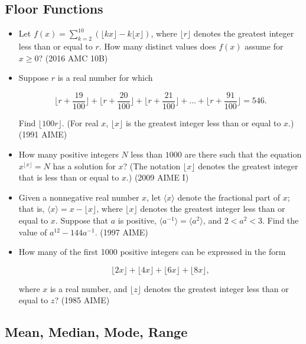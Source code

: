 \documentclass{article}
\begin{document}
\subsection{Floor Functions}

\begin{itemize}
\item Let $f(x)=\sum^{10}_{k=2}(\lfloor kx\rfloor - k\lfloor x\rfloor )$, where $\lfloor r\rfloor$ denotes the greatest integer less than or equal to $r$. How many distinct values does $f(x)$ assume for $x\ge 0$? (2016 AMC 10B)

\item Suppose $r$ is a real number for which

$$ \lfloor r+\frac{19}{100} \rfloor + \lfloor r+\frac{20}{100} \rfloor + \lfloor r+\frac{21}{100} \rfloor + \ldots + \lfloor r+\frac{91}{100} \rfloor =546.$$

Find $\lfloor 100r \rfloor$. (For real $x$, $\lfloor x\rfloor$ is the greatest integer less than or equal to $x$.) (1991 AIME)

\item How many positive integers $N$ less than $1000$ are there such that the equation $x^{\lfloor x\rfloor} = N$ has a solution for $x$? (The notation $\lfloor x\rfloor$ denotes the greatest integer that is less than or equal to $x$.) (2009 AIME I)

\item Given a nonnegative real number $x$, let $\langle x\rangle$ denote the fractional part of $x$; that is, $\langle x\rangle=x-\lfloor x\rfloor$, where $\lfloor x\rfloor$ denotes the greatest integer less than or equal to $x$. Suppose that $a$ is positive, $\langle a^{-1}\rangle=\langle a^2\rangle$, and $2<a^2<3$. Find the value of $a^{12}-144a^{-1}$. (1997 AIME)

\item How many of the first 1000 positive integers can be expressed in the form

$$ \lfloor 2x\rfloor + \lfloor 4x\rfloor + \lfloor 6x\rfloor + \lfloor 8x\rfloor,$$

where $x$ is a real number, and $\lfloor z\rfloor$ denotes the greatest integer less than or equal to $z$? (1985 AIME)

\end{itemize}

\subsection{Mean, Median, Mode, Range}
\end{document}
